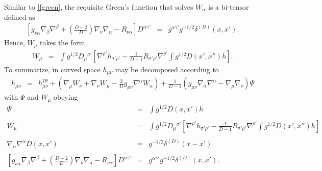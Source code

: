 \documentclass[10pt,letterpaper]{article}
\numberwithin{equation}{section}
\begin{document}
Similar to \eqref{fgreen}, the requisite Green's function that solves $W_\alpha$ is a bi-tensor defined as
\begin{eqnarray}
\left[g_{\nu\alpha}\nabla_\beta\nabla^\beta + \left(\frac{D-2}{D}\right)\nabla_\nu \nabla_\alpha - R_{\nu\alpha}\right]D^{\alpha\gamma'} &=& g^{\alpha\gamma'} g^{-1/2} \delta^{(D)}(x,x').
\end{eqnarray}
Hence, $W_\mu$ takes the form
\begin{eqnarray}
W_{\mu} &=& \int g^{1/2} D_\mu{}^{\sigma'} \left[ \nabla^{\rho'} h_{\sigma'\rho'}-
 \frac{1}{D-1}R_{\sigma'\rho'}\nabla^{\rho'} \int g^{1/2} D(x',x'') h\right].
\end{eqnarray}
To summarize, in curved space $h_{\mu\nu}$ may be decomposed according to
\begin{eqnarray}
h_{\mu\nu} &=& h_{\mu\nu}^{T\theta} + \left(\nabla_\mu W_\nu + \nabla_\nu W_\mu - \frac{2}{D}g_{\mu\nu}\nabla^\alpha W_\alpha\right) +\frac{1}{D-1}\left( g_{\mu\nu}\nabla_\alpha \nabla^\alpha - \nabla_\mu\nabla_\nu\right)\Psi
\end{eqnarray}
with $\Psi$ and $W_{\mu}$ obeying
\begin{eqnarray}
\Psi &=& \int g^{1/2}D(x,x')h
\\ \nonumber\\
W_{\mu} &=& \int g^{1/2} D_\mu{}^{\sigma'} \left[ \nabla^{\rho'} h_{\sigma'\rho'}-
\frac{1}{D-1}R_{\sigma'\rho'}\nabla^{\rho'} \int g^{1/2} D(x',x'') h\right]
\nonumber\\
\\
 \nabla_\alpha \nabla^\alpha D(x,x') &=& g^{-1/2}\delta^{(D)} (x-x')
\\ \nonumber\\
\left[g_{\nu\alpha}\nabla_\beta\nabla^\beta + \left(\frac{D-2}{D}\right)\nabla_\nu \nabla_\alpha - R_{\nu\alpha}\right]D^{\alpha\gamma'} &=& g^{\alpha\gamma'} g^{-1/2} \delta^{(D)}(x,x').
\end{eqnarray}
%
%
\end{document}
